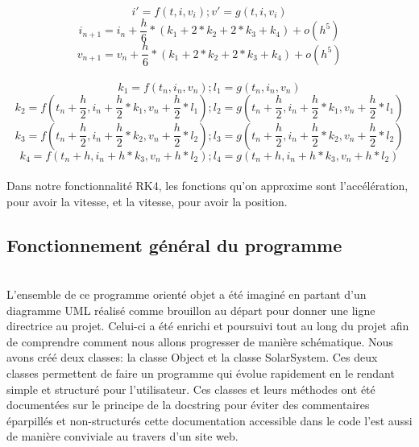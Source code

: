 \documentclass[11pt]{article}
\begin{document}
\begin{equation}
i'= f(t,i,v_{i}) ; v'= g(t,i,v_{i})
\end{equation}
\begin{equation}
i_{n+1}= i_{n} + \frac{h}{6} * (k_{1} +2*k_{2} + 2*k_{3} + k_{4}) +o(h^5)
\end{equation}
\begin{equation}
v_{n+1}= v_{n} + \frac{h}{6} * (k_{1} +2*k_{2} + 2*k_{3} + k_{4}) +o(h^5)
\end{equation}
\\[2 mm]
\begin{equation}
k_{1}=f(t_{n},i_{n},v_{n}) ; l_{1}=g(t_{n},i_{n},v_{n})
\end{equation}
\begin{equation}
k_{2}=f(t_{n}+\frac{h}{2},i_{n}+\frac{h}{2}*k_{1},v_{n}+\frac{h}{2}*l_{1}) ; l_{2}=g(t_{n}+\frac{h}{2},i_{n}+\frac{h}{2}*k_{1},v_{n}+\frac{h}{2}*l_{1})
\end{equation}
\begin{equation}
k_{3}=f(t_{n}+\frac{h}{2},i_{n}+\frac{h}{2}*k_{2},v_{n}+\frac{h}{2}*l_{2}) ; l_{3}=g(t_{n}+\frac{h}{2},i_{n}+\frac{h}{2}*k_{2},v_{n}+\frac{h}{2}*l_{2})
\end{equation}
\begin{equation}
k_{4}=f(t_{n}+h,i_{n}+h*k_{3},v_{n}+h*l_{2});l_{4}=g(t_{n}+h,i_{n}+h*k_{3},v_{n}+h*l_{2})
\end{equation}
\\[2 mm]
Dans notre fonctionnalité RK4, les fonctions qu'on approxime sont l'accélération, pour avoir la vitesse, et la vitesse, pour avoir la position.

\subsection{Fonctionnement général du programme}
\\[2 mm]
L'ensemble de ce programme orienté objet a été imaginé en partant d'un diagramme UML réalisé comme brouillon au départ pour donner une ligne directrice au projet. Celui-ci a été enrichi et poursuivi tout au long du projet afin de comprendre comment nous allons progresser de manière schématique.
Nous avons créé deux classes: la classe Object et la classe SolarSystem. Ces deux classes permettent de faire un programme qui évolue rapidement en le rendant simple et structuré pour l'utilisateur. Ces classes et leurs méthodes ont été documentées sur le principe de la docstring pour éviter des commentaires éparpillés et non-structurés cette documentation accessible dans le code l'est aussi de manière conviviale au travers d'un site web.
\\[2 mm]
\end{document}
